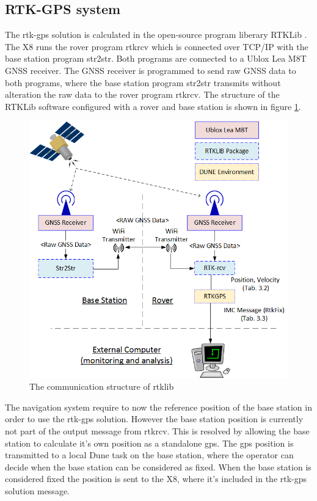\subsection{RTK-GPS system}
The \gls{rtk-gps} solution is calculated in the open-source program liberary RTKLib \citep{takasu2009development}.
The X8 runs the rover program rtkrcv which is connected over TCP/IP with the base station program str2str. Both programs are connected to a Ublox Lea M8T GNSS receiver. The GNSS receiver is programmed to send raw GNSS data to both programs, where the base station program str2str transmits without alteration the raw data to the rover program rtkrcv. The structure of the RTKLib software configured with a rover and base station is shown in figure \ref{figure:RTKLIB_STRUCTURE}.
\clearpage
\begin{figure}[H]
	\centering
		\includegraphics[width=1\textwidth]{figs/RTKLIB.png}
		\caption{The communication structure of \gls{rtklib}}
		\label{figure:RTKLIB_STRUCTURE}
\end{figure}
\clearpage
The navigation system require to now the reference position of the base station in order to use the \gls{rtk-gps} solution. However the base station position is currently not part of the output message from rtkrcv. This is resolved by allowing the base station to calculate it's own position as a standalone \gls{gps}. The \gls{gps} position is transmitted to a local Dune task on the base station, where the operator can decide when the base station can be considered as fixed. When the base station is considered fixed the position is sent to the X8, where it's included in the \gls{rtk-gps} solution message.
